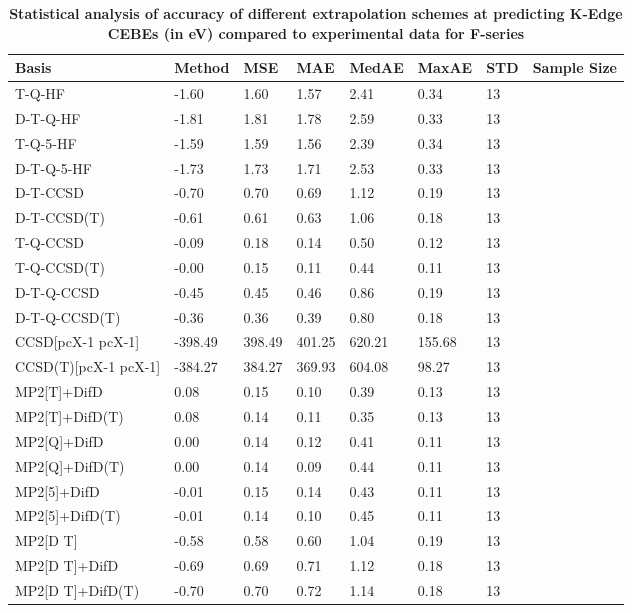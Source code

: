 \begin{table}
  \caption{\textbf{Statistical analysis of accuracy of different extrapolation schemes at predicting K-Edge CEBEs (in eV) compared to experimental data for F-series}}
  \label{tbl:extrap-scheme-summary-f}
  \begin{tabular}{l l l l l l l l }
    \toprule
    \textbf{Basis} & \textbf{Method} & \textbf{MSE} & \textbf{MAE} & \textbf{MedAE} & \textbf{MaxAE} & \textbf{STD} & \textbf{Sample Size} \\ 
    \midrule
    T-Q-HF & -1.60 & 1.60 & 1.57 & 2.41 & 0.34 & 13 \\ 
    D-T-Q-HF & -1.81 & 1.81 & 1.78 & 2.59 & 0.33 & 13 \\ 
    T-Q-5-HF & -1.59 & 1.59 & 1.56 & 2.39 & 0.34 & 13 \\ 
    D-T-Q-5-HF & -1.73 & 1.73 & 1.71 & 2.53 & 0.33 & 13 \\ 
    D-T-CCSD & -0.70 & 0.70 & 0.69 & 1.12 & 0.19 & 13 \\ 
    D-T-CCSD(T) & -0.61 & 0.61 & 0.63 & 1.06 & 0.18 & 13 \\ 
    T-Q-CCSD & -0.09 & 0.18 & 0.14 & 0.50 & 0.12 & 13 \\ 
    T-Q-CCSD(T) & -0.00 & 0.15 & 0.11 & 0.44 & 0.11 & 13 \\ 
    D-T-Q-CCSD & -0.45 & 0.45 & 0.46 & 0.86 & 0.19 & 13 \\ 
    D-T-Q-CCSD(T) & -0.36 & 0.36 & 0.39 & 0.80 & 0.18 & 13 \\ 
    CCSD[pcX-1 pcX-1] & -398.49 & 398.49 & 401.25 & 620.21 & 155.68 & 13 \\ 
    CCSD(T)[pcX-1 pcX-1] & -384.27 & 384.27 & 369.93 & 604.08 & 98.27 & 13 \\ 
    MP2[T]+DifD & 0.08 & 0.15 & 0.10 & 0.39 & 0.13 & 13 \\ 
    MP2[T]+DifD(T) & 0.08 & 0.14 & 0.11 & 0.35 & 0.13 & 13 \\ 
    MP2[Q]+DifD & 0.00 & 0.14 & 0.12 & 0.41 & 0.11 & 13 \\ 
    MP2[Q]+DifD(T) & 0.00 & 0.14 & 0.09 & 0.44 & 0.11 & 13 \\ 
    MP2[5]+DifD & -0.01 & 0.15 & 0.14 & 0.43 & 0.11 & 13 \\ 
    MP2[5]+DifD(T) & -0.01 & 0.14 & 0.10 & 0.45 & 0.11 & 13 \\ 
    MP2[D T] & -0.58 & 0.58 & 0.60 & 1.04 & 0.19 & 13 \\ 
    MP2[D T]+DifD & -0.69 & 0.69 & 0.71 & 1.12 & 0.18 & 13 \\ 
    MP2[D T]+DifD(T) & -0.70 & 0.70 & 0.72 & 1.14 & 0.18 & 13 \\ 

\end{tabular}
\end{table}
